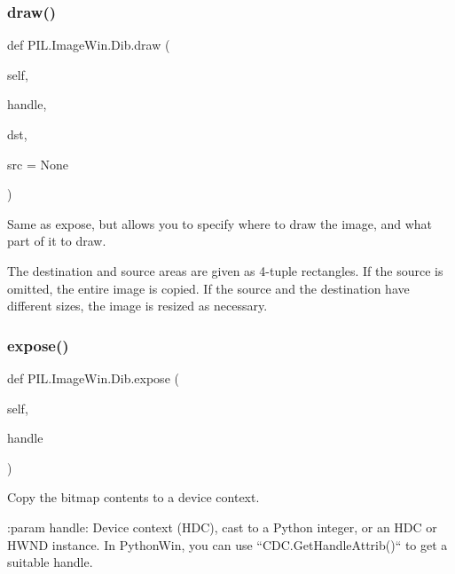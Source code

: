 \subsubsection{\texorpdfstring{draw()}{draw()}}
{\footnotesize\ttfamily def P\+I\+L.\+Image\+Win.\+Dib.\+draw (\begin{DoxyParamCaption}\item[{}]{self,  }\item[{}]{handle,  }\item[{}]{dst,  }\item[{}]{src = {\ttfamily None} }\end{DoxyParamCaption})}

\begin{DoxyVerb}Same as expose, but allows you to specify where to draw the image, and
what part of it to draw.

The destination and source areas are given as 4-tuple rectangles. If
the source is omitted, the entire image is copied. If the source and
the destination have different sizes, the image is resized as
necessary.
\end{DoxyVerb}
 \mbox{\label{classPIL_1_1ImageWin_1_1Dib_ab887b4c46b393604b27169ce9e716e2c}} 
\subsubsection{\texorpdfstring{expose()}{expose()}}
{\footnotesize\ttfamily def P\+I\+L.\+Image\+Win.\+Dib.\+expose (\begin{DoxyParamCaption}\item[{}]{self,  }\item[{}]{handle }\end{DoxyParamCaption})}

\begin{DoxyVerb}Copy the bitmap contents to a device context.

:param handle: Device context (HDC), cast to a Python integer, or an
       HDC or HWND instance.  In PythonWin, you can use
       ``CDC.GetHandleAttrib()`` to get a suitable handle.
\end{DoxyVerb}
 \mbox{\label{classPIL_1_1ImageWin_1_1Dib_a7770f97d7b54875639b81f08c61870fc}} 
